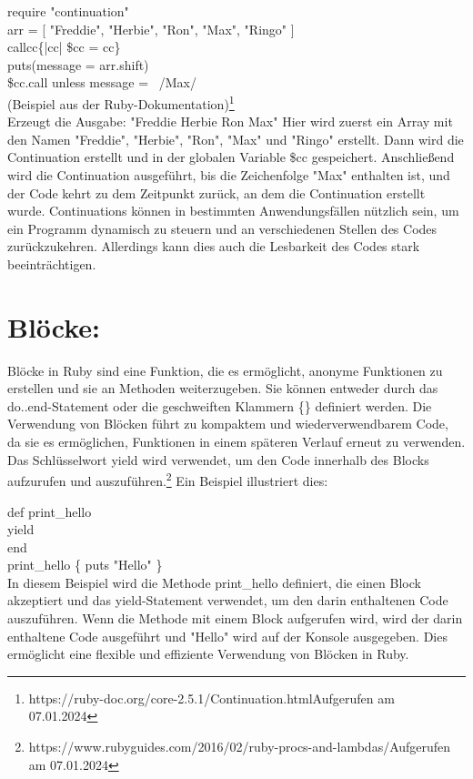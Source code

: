 \documentclass{article}
\begin{document}
require "continuation" \\ 
arr = [ "Freddie", "Herbie", "Ron", "Max", "Ringo" ] \\ 
callcc\{|cc| \$cc = cc\} \\ 
puts(message = arr.shift) \\ 
\$cc.call unless message =~ /Max/ \\ 
(Beispiel aus der Ruby-Dokumentation)\footnote{https://ruby-doc.org/core-2.5.1/Continuation.htmlAufgerufen am 07.01.2024} \\ 
Erzeugt die Ausgabe: "Freddie Herbie Ron Max" 
Hier wird zuerst ein Array mit den Namen "Freddie", "Herbie", "Ron", "Max" und "Ringo" erstellt. Dann wird die Continuation erstellt und in der globalen Variable \$cc gespeichert. Anschließend wird die Continuation ausgeführt, bis die Zeichenfolge "Max" enthalten ist, und der Code kehrt zu dem Zeitpunkt zurück, an dem die Continuation erstellt wurde.
Continuations können in bestimmten Anwendungsfällen nützlich sein, um ein Programm dynamisch zu steuern und an verschiedenen Stellen des Codes zurückzukehren. Allerdings kann dies auch die Lesbarkeit des Codes stark beeinträchtigen.
\section*{ Blöcke:}
Blöcke in Ruby sind eine Funktion, die es ermöglicht, anonyme Funktionen zu erstellen und sie an Methoden weiterzugeben. Sie können entweder durch das do..end-Statement oder die geschweiften Klammern \{\} definiert werden. Die Verwendung von Blöcken führt zu kompaktem und wiederverwendbarem Code, da sie es ermöglichen, Funktionen in einem späteren Verlauf erneut zu verwenden. Das Schlüsselwort yield wird verwendet, um den Code innerhalb des Blocks aufzurufen und auszuführen.\footnote{https://www.rubyguides.com/2016/02/ruby-procs-and-lambdas/Aufgerufen am 07.01.2024}
Ein Beispiel illustriert dies:

def print\_hello\\ 
yield\\ 
end\\ 

print\_hello \{ puts "Hello" \}\\ 
In diesem Beispiel wird die Methode print\_hello definiert, die einen Block akzeptiert und das yield-Statement verwendet, um den darin enthaltenen Code auszuführen. Wenn die Methode mit einem Block aufgerufen wird, wird der darin enthaltene Code ausgeführt und "Hello" wird auf der Konsole ausgegeben. Dies ermöglicht eine flexible und effiziente Verwendung von Blöcken in Ruby.
\end{document}
